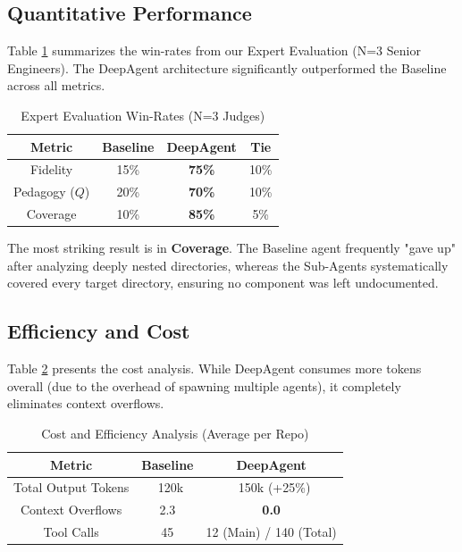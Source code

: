 \documentclass[conference]{IEEEtran}
\begin{document}
\subsection{Quantitative Performance}
Table \ref{tab1} summarizes the win-rates from our Expert Evaluation (N=3 Senior Engineers). The DeepAgent architecture significantly outperformed the Baseline across all metrics.

\begin{table}[htbp]
\caption{Expert Evaluation Win-Rates (N=3 Judges)}
\begin{center}
\begin{tabular}{|c|c|c|c|}
\hline
\textbf{Metric} & \textbf{Baseline} & \textbf{DeepAgent} & \textbf{Tie} \\
\hline
Fidelity & 15\% & \textbf{75\%} & 10\% \\
\hline
Pedagogy ($Q$) & 20\% & \textbf{70\%} & 10\% \\
\hline
Coverage & 10\% & \textbf{85\%} & 5\% \\
\hline
\end{tabular}
\label{tab1}
\end{center}
\end{table}

The most striking result is in \textbf{Coverage}. The Baseline agent frequently "gave up" after analyzing deeply nested directories, whereas the Sub-Agents systematically covered every target directory, ensuring no component was left undocumented.

\subsection{Efficiency and Cost}
Table \ref{tab2} presents the cost analysis. While DeepAgent consumes more tokens overall (due to the overhead of spawning multiple agents), it completely eliminates context overflows.

\begin{table}[htbp]
\caption{Cost and Efficiency Analysis (Average per Repo)}
\begin{center}
\begin{tabular}{|c|c|c|}
\hline
\textbf{Metric} & \textbf{Baseline} & \textbf{DeepAgent} \\
\hline
Total Output Tokens & ~120k & ~150k (+25\%) \\
\hline
Context Overflows & 2.3 & \textbf{0.0} \\
\hline
Tool Calls & 45 & 12 (Main) / 140 (Total) \\
\hline
\end{tabular}
\label{tab2}
\end{center}
\end{table}
\end{document}
